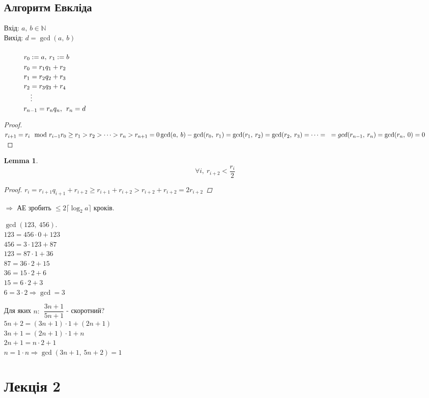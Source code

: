 \documentclass[a4paper,12pt, centered]{bookest}
\newtheorem{lemma}[theorem]{Lemma}
\newcommand\tab[1][1cm]{\hspace*{#1}}
\begin{document}
\section{Алгоритм Евкліда}
Вхід: $a,\>b\in\mathbb{N}$\\
Вихід: $d=\gcd(a,\>b)$\\\\
$\tab r_0:=a,\>r_1:=b$\\
$\tab r_0=r_1q_1+r_2$\\
$\tab r_1=r_2q_2+r_3$\\
$\tab r_2=r_3q_3+r_4$\\
$\tab\quad\vdots$\\
$\tab r_{n-1}=r_nq_n,\>\>r_n=d$
\begin{proof}
	$r_{i+1}=r_{i}\mod r_{i-1}\\ r_0\geq r_1>r_2>\dots>r_{n}>r_{n+1}=0\\\gcd(a,\>b)-\gcd(r_0,\>r_1)=\gcd(r_1,\>r_2)=\gcd(r_2,\>r_3)=\dots=\\\ =gcd(r_{n-1},\>r_n)=\gcd(r_n,\>0)=0$
\end{proof}
\begin{lemma}
	$$\forall i,\>r_{i+2}<\dfrac{r_i}{2}$$
	\begin{proof}
		$r_i=r_{i+1}q_{i+1}+r_{i+2}\geq r_{i+1}+r_{i+2}>r_{i+2}+r_{i+2}=2r_{i+2}$
	\end{proof}
\end{lemma}
$\Rightarrow$ АЕ зробить $\leq2\lceil\log_2a\rceil$ кроків.
\begin{example}
	$\gcd(123,\>456).$\\
	$123=456\cdot 0+123$\\
	$456=3\cdot 123+87$\\
	$123=87\cdot 1+36$\\
	$87=36\cdot 2+15$\\
	$36=15\cdot 2+6$\\
	$15=6\cdot 2+3$\\
	$6=3\cdot2\Rightarrow \gcd = 3$
\end{example}
\begin{example}
	Для яких $n:\>\>\dfrac{3n+1}{5n+1}$ - скоротний?\\
	$5n+2=(3n+1)\cdot 1+(2n+1)$\\
	$3n+1=(2n+1)\cdot 1+n$\\
	$2n+1=n\cdot 2+1$\\
	$n=1\cdot n\Rightarrow\gcd(3n+1,\>5n+2)=1$
\end{example}
\chapter{Лекція 2}
\end{document}

